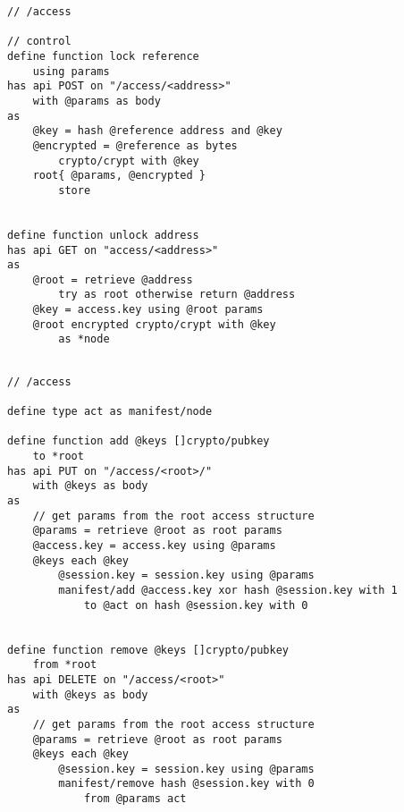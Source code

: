 \begin{definition}\label{def:ac-api}
\begin{lstlisting}[language=buzz1]
// /access

// control 
define function lock reference
    using params
has api POST on "/access/<address>"
    with @params as body
as
    @key = hash @reference address and @key 
    @encrypted = @reference as bytes 
        crypto/crypt with @key
    root{ @params, @encrypted } 
        store
        

define function unlock address
has api GET on "access/<address>"
as
    @root = retrieve @address 
        try as root otherwise return @address
    @key = access.key using @root params
    @root encrypted crypto/crypt with @key
        as *node
    
\end{lstlisting}
\end{definition}

\begin{definition}\label{def:act-api}
\begin{lstlisting}[language=buzz1]
// /access

define type act as manifest/node

define function add @keys []crypto/pubkey
    to *root
has api PUT on "/access/<root>/" 
    with @keys as body
as 
    // get params from the root access structure
    @params = retrieve @root as root params
    @access.key = access.key using @params                      
    @keys each @key
        @session.key = session.key using @params
        manifest/add @access.key xor hash @session.key with 1
            to @act on hash @session.key with 0  
            

define function remove @keys []crypto/pubkey
    from *root   
has api DELETE on "/access/<root>" 
    with @keys as body
as 
    // get params from the root access structure
    @params = retrieve @root as root params
    @keys each @key
        @session.key = session.key using @params
        manifest/remove hash @session.key with 0  
            from @params act 
             

\end{lstlisting}
\end{definition}